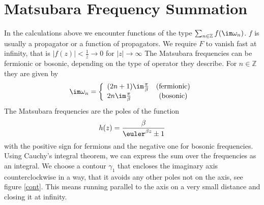 \documentclass[a4paper,12pt]{uiofysmaster}
\begin{document}
\tableofcontents















\appendix

\chapter{Matsubara Frequency Summation} \label{MFS}

In the calculations above we encounter functions of the type 
$ \sum_{n \in \mathbb{Z}} f(\im \omega_n)$.
$f$ is usually a propagator or a function of propagators. 
We require $F$ to vanish fast at infinity, that is $|f(z)|< \frac1z\rightarrow 0$ for $|z|\rightarrow \infty$ 
The Matsubara frequencies can be fermionic or bosonic, depending on the type of operator they describe.
For $n \in \mathbb{Z}$ they are given by
\begin{equation}
 \im \omega_n = \left\{ \begin{array}{l @{\quad}c} (2n+1)\im \frac{\pi }{\beta} & \text{(fermionic)} \\ 2n\im\frac{ \pi}{\beta} & \text{(bosonic)} \end{array} \right.
\end{equation}
The Matsubara frequencies are the poles of the function
\begin{equation}
h(z) = \frac{\beta}{\euler^{\beta z} \pm 1} 
\end{equation}
with the positive sign for fermions and the negative one for bosonic frequencies. 
Using Cauchy's integral theorem, we can express the sum over the frequencies as an integral. 
We choose a contour $\gamma_1$ that encloses the imaginary axis counterclockwise in a way, that it avoids any other poles not on the axis, see figure \ref{cont}.
This means running parallel to the axis on a very small distance and closing it at infinity.
\end{document}
